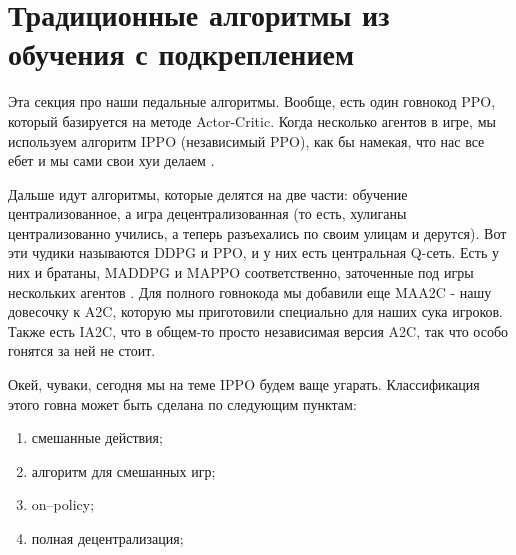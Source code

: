 % 
% 
% 

\section{Традиционные алгоритмы из обучения с подкреплением}
Эта секция про наши педальные алгоритмы. Вообще, есть один говнокод PPO, который базируется на методе Actor-Critic. Когда несколько агентов в игре, мы используем алгоритм IPPO (независимый PPO), как бы намекая, что нас все ебет и мы сами свои хуи делаем \cite{DBLP:journals/corr/abs-2103-01955}.

Дальше идут алгоритмы, которые делятся на две части: обучение централизованное, а игра децентрализованная (то есть, хулиганы централизованно учились, а теперь разъехались по своим улицам и дерутся). Вот эти чудики называются DDPG и PPO, и у них есть центральная Q-сеть. Есть у них и братаны, MADDPG и MAPPO соответственно, заточенные под игры нескольких агентов \cite{https://doi.org/10.48550/arxiv.1509.02971}. Для полного говнокода мы добавили еще MAA2C - нашу довесочку к A2C, которую мы приготовили специально для наших сука игроков. Также есть IA2C, что в общем-то просто независимая версия A2C, так что особо гонятся за ней не стоит.


Окей, чуваки, сегодня мы на теме IPPO будем ваще угарать. Классификация этого говна может быть сделана по следующим пунктам:
\begin{enumerate}[label={\arabic*)}]
\item смешанные действия;
\item алгоритм для смешанных игр;
\item on--policy;
\item полная децентрализация;
\end{enumerate}

